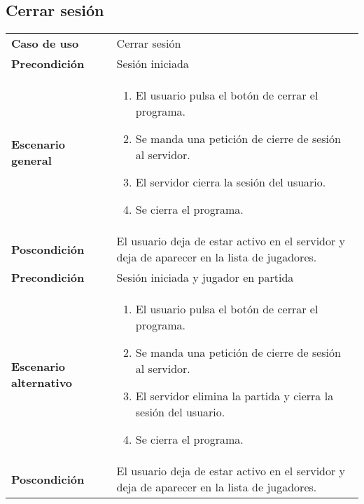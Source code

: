 \subsection{Cerrar sesión}

{\footnotesize
\begin{tabularx}{0.95\textwidth}{p{}|X}

\textbf{Caso de uso} & Cerrar sesión \\

\textbf{Precondición} & Sesión iniciada \\

\textbf{Escenario general} & \begin{enumerate}
\item El usuario pulsa el botón de cerrar el programa.
\item Se manda una petición de cierre de sesión al servidor.
\item El servidor cierra la sesión del usuario.
\item Se cierra el programa.
\end{enumerate} \\

\textbf{Poscondición} & El usuario deja de estar activo en el servidor y deja de aparecer
en la lista de jugadores.\\

\textbf{Precondición} & Sesión iniciada y jugador en partida \\

\textbf{Escenario alternativo} & \begin{enumerate}
\item El usuario pulsa el botón de cerrar el programa.
\item Se manda una petición de cierre de sesión al servidor.
\item El servidor elimina la partida y cierra la sesión del usuario.
\item Se cierra el programa.
\end{enumerate} \\

\textbf{Poscondición} & El usuario deja de estar activo en el servidor y deja de aparecer
en la lista de jugadores.

\end{tabularx}
}

